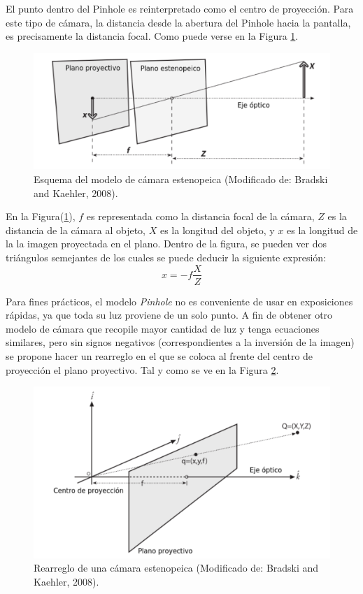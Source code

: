 \documentclass{book}
\begin{document}
El punto dentro del Pinhole es reinterpretado como el centro de proyección. Para este tipo de cámara, la distancia desde la abertura del Pinhole hacia la pantalla, es precisamente la distancia focal. Como puede verse en la Figura \ref{fig:pinholeScheme}.\\
	
\begin{figure}
	\centering		
	\includegraphics[scale=0.8]{images/pinholeScheme.pdf}
	\caption{Esquema del modelo de cámara estenopeica (Modificado de: Bradski and Kaehler, 2008).}		
	\label{fig:pinholeScheme}
\end{figure}

En la Figura(\ref{fig:pinholeScheme}), $f$ es representada como la distancia focal de la cámara, $Z$ es la distancia de la cámara al objeto, $X$ es la longitud del objeto, y $x$ es la longitud de la la imagen proyectada en el plano. Dentro de la figura, se pueden ver dos triángulos semejantes de los cuales se puede deducir la siguiente expresión:
\[x = -f \frac{X}{Z}\]
	
Para fines prácticos, el modelo \textit{Pinhole} no es conveniente de usar en exposiciones rápidas, ya que toda su luz proviene de un solo punto. A fin de obtener otro modelo de cámara que recopile mayor cantidad de luz y tenga ecuaciones similares, pero sin signos negativos (correspondientes a la inversión de la imagen) se propone hacer un rearreglo en el que se coloca al frente del centro de proyección el plano proyectivo. Tal y como se ve en la Figura \ref{fig:rearrange_pinhole_scheme}.
	
\begin{figure}
	\centering
	\includegraphics[scale=0.8]{images/rearrange_pinhole_scheme.pdf}
    \caption{Rearreglo de una cámara estenopeica (Modificado de: Bradski and Kaehler, 2008).}
    \label{fig:rearrange_pinhole_scheme}
\end{figure} 
\end{document}
